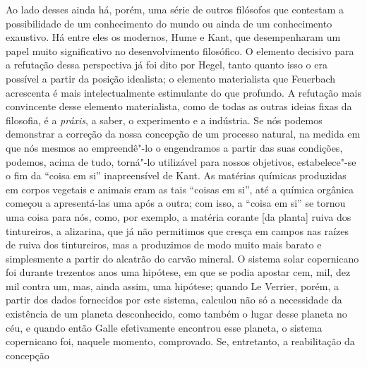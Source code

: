 Ao lado desses ainda há, porém, uma série de outros filósofos que
contestam a possibilidade de um conhecimento do mundo ou ainda de um
conhecimento exaustivo. Há entre eles os
modernos, Hume e Kant,
que desempenharam um papel muito significativo no desenvolvimento
filosófico. O elemento decisivo para a refutação dessa perspectiva já foi
dito por Hegel, tanto quanto isso o era possível a partir da posição
idealista; o elemento materialista
que Feuerbach acrescenta
é mais intelectualmente estimulante do que profundo. A refutação mais
convincente desse elemento materialista, como de todas as outras ideias fixas
da filosofia, é a \emph{práxis}, a saber, o 
experimento e a indústria. Se nós podemos demonstrar a correção da nossa
concepção de um processo natural, na medida em que nós mesmos ao
empreendê"-lo o engendramos a partir das suas condições, podemos, acima
de tudo, torná"-lo utilizável para nossos objetivos, estabelece"-se o fim
da ``coisa em si'' inapreensível
de Kant.
As matérias químicas produzidas em corpos vegetais e animais eram as
tais ``coisas em si'', até a química orgânica começou a
apresentá-las uma após a outra; com isso, a ``coisa em si'' se tornou uma
coisa para nós, como, por exemplo, a matéria corante {[}da planta{]}
ruiva dos tintureiros, a alizarina, que já não permitimos que cresça em
campos nas raízes de ruiva dos tintureiros, mas a produzimos de modo
muito mais barato e simplesmente a partir do alcatrão do carvão mineral.
O sistema solar copernicano foi durante trezentos anos uma hipótese, em
que se podia apostar cem, mil, dez mil contra um, mas, ainda assim, uma
hipótese; quando Le Verrier, porém, a partir dos dados fornecidos por
este sistema, calculou não só a necessidade da existência de um planeta
desconhecido, como também o lugar desse planeta no céu, e quando então
Galle efetivamente encontrou esse planeta,
o sistema copernicano foi, naquele momento, comprovado. Se, entretanto, a reabilitação da concepção
